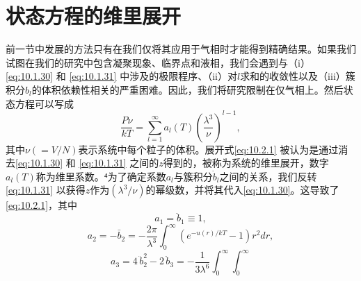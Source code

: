 \section{状态方程的维里展开}\label{ux72b6ux6001ux65b9ux7a0bux7684ux7ef4ux91ccux5c55ux5f00}
前一节中发展的方法只有在我们仅将其应用于气相时才能得到精确结果。如果我们试图在我们的研究中包含凝聚现象、临界点和液相，我们会遇到与（i）\autoref{eq:10.1.30} 和 \autoref{eq:10.1.31} 中涉及的极限程序、（ii）对\(l\)求和的收敛性以及（iii）簇积分\(b_{l}\)的体积依赖性相关的严重困难。因此，我们将研究限制在仅气相上。然后状态方程可以写成
\begin{equation}\tag{10.2.1}\label{eq:10.2.1}
\frac { P \nu } { k T } = \sum _ { l = 1 } ^{\infty} a _ { l } ( T ) \left( \frac { \lambda ^{3} } { \nu } \right) ^{l - 1} ,
\end{equation}
其中\(\nu(=V/N)\)表示系统中每个粒子的体积。展开式\autoref{eq:10.2.1} 被认为是通过消去\autoref{eq:10.1.30} 和 \autoref{eq:10.1.31} 之间的\(z\)得到的，被称为系统的维里展开，数字\(a_{l}(T)\)称为维里系数。⁴为了确定系数\(a_{l}\)与簇积分\(\dot{b}_{l}\)之间的关系，我们反转\autoref{eq:10.1.31} 以获得\(z\)作为\((\lambda^{3}/\nu)\)的幂级数，并将其代入\autoref{eq:10.1.30}。这导致了\autoref{eq:10.2.1}，其中
\begin{equation}\tag{10.2.2}\label{eq:10.2.2}
a _ { 1 } = \ddot { b } _ { 1 } \equiv 1 ,
\end{equation}
\begin{equation}\tag{10.2.3}\label{eq:10.2.3}
a _ { 2 } = - \bar { b } _ { 2 } = - \frac { 2 \pi } { \lambda ^{3} } \int _ { 0 } ^{\infty} \left( e ^{- u ( r ) / k T} - 1 \right) r ^{2} d r ,
\end{equation}
\begin{equation}\tag{10.2.4}\label{eq:10.2.4}
a _ { 3 } = 4 \, \ddot { b } _ { 2 } ^{2} - 2 \, \ddot { b } _ { 3 } = - \frac { 1 } { 3 \lambda ^{6} } \int _ { 0 } ^{\infty}    \int _ { 0 } ^{\infty}                                                                                                                                                                                                                                                                                                                                                                                                                                                                                                                                                                                                                                                                                                                                                                                                                                                                                                                                                                                                                 
\end{equation}
